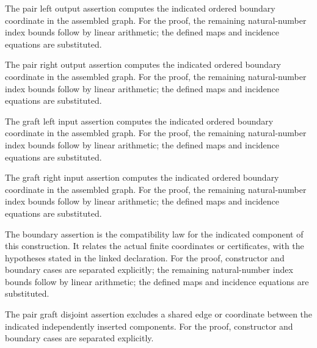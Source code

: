 The pair left output assertion computes the indicated ordered boundary coordinate in the assembled graph.
For the proof, the remaining natural-number index bounds follow by linear arithmetic; the defined maps and incidence equations are substituted.
\par{}

The pair right output assertion computes the indicated ordered boundary coordinate in the assembled graph.
For the proof, the remaining natural-number index bounds follow by linear arithmetic; the defined maps and incidence equations are substituted.
\par{}

The graft left input assertion computes the indicated ordered boundary coordinate in the assembled graph.
For the proof, the remaining natural-number index bounds follow by linear arithmetic; the defined maps and incidence equations are substituted.
\par{}

The graft right input assertion computes the indicated ordered boundary coordinate in the assembled graph.
For the proof, the remaining natural-number index bounds follow by linear arithmetic; the defined maps and incidence equations are substituted.
\par{}

The boundary assertion is the compatibility law for the indicated component of this construction. It relates the actual finite coordinates or certificates, with the hypotheses stated in the linked declaration.
For the proof, constructor and boundary cases are separated explicitly; the remaining natural-number index bounds follow by linear arithmetic; the defined maps and incidence equations are substituted.
\par{}

The pair graft disjoint assertion excludes a shared edge or coordinate between the indicated independently inserted components.
For the proof, constructor and boundary cases are separated explicitly.
\par{}

